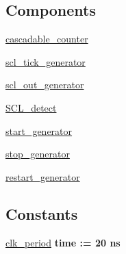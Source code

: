 \subsection*{Components}
 \begin{DoxyCompactItemize}
\item 
\hyperlink{classtb___s___p___sr_1_1behavioral_a43b32943cff2ea9c75d864730f7a4f8e}{cascadable\+\_\+counter}  {\bfseries }  
\item 
\hyperlink{classtb___s___p___sr_1_1behavioral_ad15332f3450dcfdd8b69d4dc7006f72c}{scl\+\_\+tick\+\_\+generator}  {\bfseries }  
\item 
\hyperlink{classtb___s___p___sr_1_1behavioral_a2e4722e32567a27d294c176f4f8603c5}{scl\+\_\+out\+\_\+generator}  {\bfseries }  
\item 
\hyperlink{classtb___s___p___sr_1_1behavioral_ac7f4cd134c0e83e439609642b47df7d2}{S\+C\+L\+\_\+detect}  {\bfseries }  
\item 
\hyperlink{classtb___s___p___sr_1_1behavioral_a455446c75a95cb11c113b7509a08bc5a}{start\+\_\+generator}  {\bfseries }  
\item 
\hyperlink{classtb___s___p___sr_1_1behavioral_ad7831417f03bd84c318e1dd9bd53c0bf}{stop\+\_\+generator}  {\bfseries }  
\item 
\hyperlink{classtb___s___p___sr_1_1behavioral_a75a9bef9f515880dd0a2b91dca6ca827}{restart\+\_\+generator}  {\bfseries }  
\end{DoxyCompactItemize}
\subsection*{Constants}
 \begin{DoxyCompactItemize}
\item 
\hyperlink{classtb___s___p___sr_1_1behavioral_a608ca2ccf8923ddf0eee96f9c7d0e712}{clk\+\_\+period} {\bfseries \textcolor{vhdlchar}{time}\textcolor{vhdlchar}{ }\textcolor{vhdlchar}{ }\textcolor{vhdlchar}{\+:}\textcolor{vhdlchar}{=}\textcolor{vhdlchar}{ }\textcolor{vhdlchar}{ }\textcolor{vhdlchar}{ } \textcolor{vhdldigit}{20} \textcolor{vhdlchar}{ }\textcolor{vhdlchar}{ns}\textcolor{vhdlchar}{ }} 
\end{DoxyCompactItemize}
